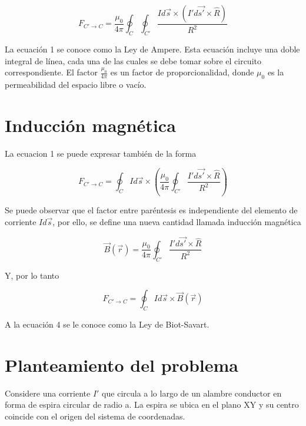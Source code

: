\documentclass{article}
\begin{document}
\begin{multicols}{2}
\begin{equation}
    F_{C' \rightarrow C}=\frac{\mu_0}{4\pi} \oint_C \oint_{C'} \frac{Id\vec{s}\times (I'd\vec{s'} \times \hat{R} ) }{R^2}
\end{equation}

La ecuación 1 se conoce como la Ley de Ampere. Esta ecuación incluye una doble integral de línea, cada una de las cuales se debe tomar sobre el circuito correspondiente. El factor $\frac{\mu_0}{4\pi}$ es un factor de proporcionalidad, donde $\mu_0$ es la permeabilidad del espacio libre o vacío.

\section{Inducción magnética}
La ecuacion 1 se puede expresar también de la forma

\begin{equation}
    F_{C' \rightarrow C}=\oint_C  Id\vec{s}\times  \left(\frac{\mu_0}{4\pi} \oint_{C'} \frac{I'd\vec{s'} \times \hat{R}}{R^2} \right)
\end{equation}

Se puede observar que el factor entre paréntesis es independiente del elemento de corriente $Id\vec{s}$, por ello, se define una nueva cantidad llamada inducción magnética

\begin{equation}
    \vec{B}(\vec{r})= \frac{\mu_0}{4\pi} \oint_{C'} \frac{I'd\vec{s'} \times \hat{R}}{R^2}
\end{equation}

Y, por lo tanto

\begin{equation}
    F_{C' \rightarrow C}=\oint_C  Id\vec{s}\times  \vec{B}(\vec{r})
\end{equation}

A la ecuación 4 se le conoce como la Ley de Biot-Savart.

\section{Planteamiento del problema}
Considere una corriente $I'$ que circula a lo largo de un alambre conductor en forma de espira circular de radio a. La espira se ubica en el plano XY y su centro coincide con el origen del sistema de coordenadas.


\end{multicols}
\end{document}
